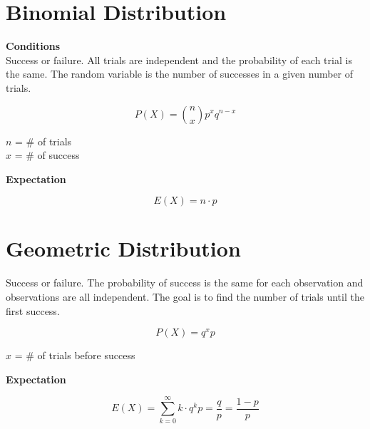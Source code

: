 \documentclass{article}
\begin{document}
\section{Binomial Distribution}
\textbf{Conditions}\\
Success or failure. All trials are independent and the probability of each trial is the same. The random variable is the number of successes in a given number of trials.
\\
\noindent
\begin{minipage}[t]{0.5\textwidth}
\[P(X) = \binom{n}{x}p^xq^{n-x}\]
\begin{center}
\(n\) = \# of trials \\
\(x\) = \# of success 
\end{center}
\end{minipage}%
\begin{minipage}[t]{0.5\textwidth}
\break 
\begin{center}
\break
    \textbf{Expectation}
\end{center}
\[E(X) = n\cdot p\]
\end{minipage}
\section{Geometric Distribution}
Success or failure. The probability of success is the same for each observation and observations are all independent. The goal is to find the number of trials until the first success.\\
\noindent
\begin{minipage}[t]{0.5\textwidth}
\[P(X) = q^x p\]
\begin{center}
    \(x\) = \# of trials before success
\end{center}
\end{minipage}%
\begin{minipage}[t]{0.5\textwidth}
\begin{center}
    \textbf{Expectation}
\end{center}
\[E(X) = \displaystyle \sum_{k=0}^\infty k \cdot q^k p = \frac{q}{p} = \frac{1-p}{p}\]
\end{minipage}
\end{document}

